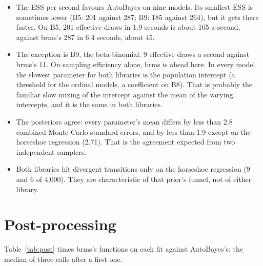 \documentclass[11pt]{article}
\begin{document}
\begin{itemize}
\item The ESS per second favours AutoBayes on nine models. Its smallest ESS is sometimes lower (B5: 201 against 287; B9:
  185 against 264), but it gets there faster. On B5, 201 effective draws in 1.9 seconds is about 105 a second, against
  brms's 287 in 6.4 seconds, about 45.
\item The exception is B9, the beta-binomial: 9 effective draws a second against brms's 11. On sampling efficiency
  alone, brms is ahead here. In every model the slowest parameter for both libraries is the population intercept (a
  threshold for the ordinal models, a coefficient on B8). That is probably the familiar slow mixing of the intercept
  against the mean of the varying intercepts, and it is the same in both libraries.
\item The posteriors agree: every parameter's mean differs by less than 2.8 combined Monte Carlo standard errors, and by
  less than 1.9 except on the horseshoe regression (2.71). That is the agreement expected from two independent samplers.
\item Both libraries hit divergent transitions only on the horseshoe regression (9 and 6 of 4,000). They are
  characteristic of that prior's funnel, not of either library.
\end{itemize}

\section{Post-processing}

Table~\ref{tab:post} times brms's functions on each fit against AutoBayes's: the median of three calls after a first one.
\end{document}
